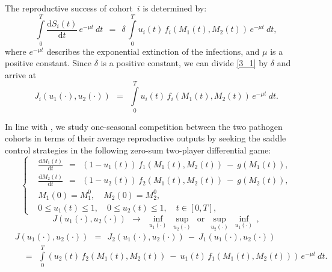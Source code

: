 \documentclass[11pt]{amsart}
\begin{document}
The reproductive success of cohort~$ i $ is determined by:
\begin{equation}
\int\limits_0^T \frac{\mathrm{d} S_i(t)}{\mathrm{d} t} \, e^{-\mu t} \: dt \:\: = \:\: \delta \,
\int\limits_0^T u_i(t) \, f_i(M_1(t), M_2(t)) \, e^{-\mu t} \: dt,  \label{3_1}
\end{equation}
where $ e^{-\mu t} $ describes the exponential extinction of the infections, and $ \mu $ is a positive constant. Since $ \delta $ is
a positive constant, we can divide \cref{3_1} by $ \delta $ and arrive at
\begin{equation}
J_i(u_1(\cdot), u_2(\cdot)) \:\: = \:\: \int\limits_0^T u_i(t) \, f_i(M_1(t), M_2(t)) \, e^{-\mu t} \: dt.  \label{3}
\end{equation}

In line with \cite{YegorovGrognardMailleretHalkettBernhard2019,BernhardGrognardMailleretAkhmetzhanov2010},
we study one-seasonal competition between the two pathogen cohorts in terms of their average reproductive outputs by
seeking the saddle control strategies in the following zero-sum two-player differential game:
\begin{equation}
\left\{ \begin{aligned}
& \frac{\mathrm{d} M_1(t)}{\mathrm{d} t} \:\: = \:\: (1 - u_1(t)) \, f_1(M_1(t), M_2(t)) \: - \: g(M_1(t)), \\
& \frac{\mathrm{d} M_2(t)}{\mathrm{d} t} \:\: = \:\: (1 - u_2(t)) \, f_2(M_1(t), M_2(t)) \: - \: g(M_2(t)), \\
& M_1(0) = M_1^0, \quad M_2(0) = M_2^0, \\
& 0 \leqslant u_1(t) \leqslant 1, \quad 0 \leqslant u_2(t) \leqslant 1, \quad t \in [0, T],
\end{aligned} \right.  \label{7}
\end{equation}
\begin{equation}
J(u_1(\cdot), u_2(\cdot)) \:\: \longrightarrow \:\: \inf_{u_1(\cdot)} \: \sup_{u_2(\cdot)} \:\: \mbox{or} \:\:
\sup_{u_2(\cdot)} \: \inf_{u_1(\cdot)} \, ,  \label{8}
\end{equation}
\begin{equation}
\begin{aligned}
& J(u_1(\cdot), u_2(\cdot)) \:\: = \:\: J_2(u_1(\cdot), u_2(\cdot)) \: - \:
J_1(u_1(\cdot), u_2(\cdot)) \\
& \quad
= \:\: \int\limits_0^T \left( u_2(t) \, f_2(M_1(t), M_2(t)) \: - \: u_1(t) \, f_1(M_1(t), M_2(t)) \right) \,
e^{-\mu t} \: dt.
\end{aligned}  \label{9}
\end{equation}
\end{document}
